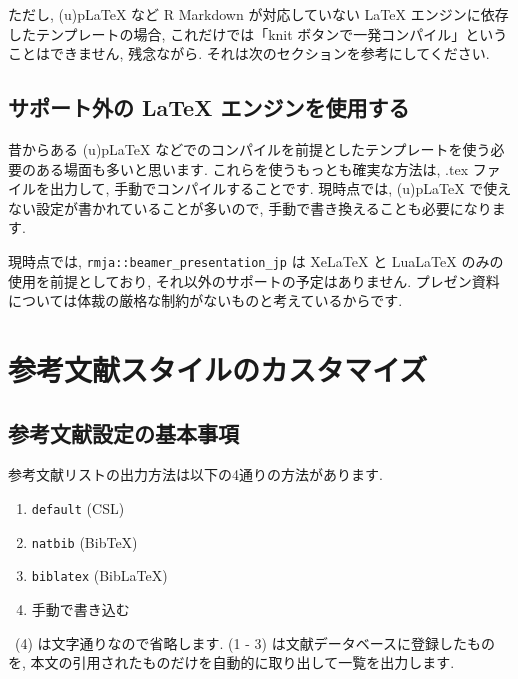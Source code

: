 \documentclass[
]{bxjsarticle}
\providecommand{\tightlist}{%
  \setlength{\itemsep}{0pt}\setlength{\parskip}{0pt}}
\begin{document}
ただし, (u)pLaTeX など R Markdown が対応していない LaTeX エンジンに依存したテンプレートの場合, これだけでは「knit ボタンで一発コンパイル」ということはできません, 残念ながら. それは次のセクションを参考にしてください.

\hypertarget{ux30b5ux30ddux30fcux30c8ux5916ux306e-latex-ux30a8ux30f3ux30b8ux30f3ux3092ux4f7fux7528ux3059ux308b}{%
\subsection{サポート外の LaTeX エンジンを使用する}\label{ux30b5ux30ddux30fcux30c8ux5916ux306e-latex-ux30a8ux30f3ux30b8ux30f3ux3092ux4f7fux7528ux3059ux308b}}

昔からある (u)pLaTeX などでのコンパイルを前提としたテンプレートを使う必要のある場面も多いと思います. これらを使うもっとも確実な方法は, .tex ファイルを出力して, 手動でコンパイルすることです. 現時点では, (u)pLaTeX で使えない設定が書かれていることが多いので, 手動で書き換えることも必要になります.

現時点では, \texttt{rmja::beamer\_presentation\_jp} は XeLaTeX と LuaLaTeX のみの使用を前提としており, それ以外のサポートの予定はありません. プレゼン資料については体裁の厳格な制約がないものと考えているからです.

\hypertarget{biblio}{%
\section{参考文献スタイルのカスタマイズ}\label{biblio}}

\hypertarget{ux53c2ux8003ux6587ux732eux8a2dux5b9aux306eux57faux672cux4e8bux9805}{%
\subsection{参考文献設定の基本事項}\label{ux53c2ux8003ux6587ux732eux8a2dux5b9aux306eux57faux672cux4e8bux9805}}

参考文献リストの出力方法は以下の4通りの方法があります.

\begin{enumerate}
\def\labelenumi{\arabic{enumi}.}
\tightlist
\item
  \texttt{default} (CSL)
\item
  \texttt{natbib} (BibTeX)
\item
  \texttt{biblatex} (BibLaTeX)
\item
  手動で書き込む
\end{enumerate}

~(4) は文字通りなので省略します. (1 - 3) は文献データベースに登録したものを, 本文の引用されたものだけを自動的に取り出して一覧を出力します.
\end{document}
